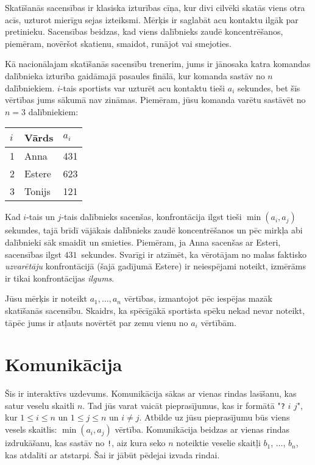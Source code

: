 

\noindent
Skatīšanās sacensības ir klasiska izturības cīņa, kur divi cilvēki skatās viens otra acīs, uzturot mierīgu sejas izteiksmi.
Mērķis ir saglabāt acu kontaktu ilgāk par pretinieku.
Sacensības beidzas, kad viens dalībnieks zaudē koncentrēšanos, piemēram, novēršot skatienu, smaidot, runājot vai smejoties.

Kā nacionālajam skatīšanās sacensību trenerim, jums ir jānosaka katra komandas dalībnieka izturība gaidāmajā pasaules finālā, kur komanda sastāv no $n$ dalībniekiem.
$i$-tais sportists var uzturēt acu kontaktu tieši $a_i$ sekundes, bet šīs vērtības jums sākumā nav zināmas.
Piemēram, jūsu komanda varētu sastāvēt no $n=3$ dalībniekiem:

\medskip
\begin{tabular}{lll}
  $i$ & Vārds & $a_i$ \\\hline
  1 & Anna &  431 \\
  2 & Estere & 623 \\
  3 & Tonijs &  121\\
\end{tabular}

\medskip
Kad $i$-tais un $j$-tais dalībnieks sacenšas, konfrontācija ilgst tieši $\min(a_i, a_j)$ sekundes, tajā brīdī vājākais dalībnieks zaudē koncentrēšanos un pēc mirkļa abi dalībnieki sāk smaidīt un smieties.
Piemēram, ja Anna sacenšas ar Esteri, sacensības ilgst $431$~sekundes.
Svarīgi ir atzīmēt, ka vērotājam no malas faktisko \emph{uzvarētāju} konfrontācijā (šajā gadījumā Estere) ir neiespējami noteikt, izmērāms ir tikai konfrontācijas \emph{ilgums}.

Jūsu mērķis ir noteikt $a_1,\ldots, a_n$ vērtības, izmantojot pēc iespējas mazāk skatīšanās sacensību.
Skaidrs, ka spēcīgākā sportista spēku nekad nevar noteikt, tāpēc jums ir atļauts novērtēt par zemu vienu no $a_i$ vērtībām.


\section*{Komunikācija}

Šis ir interaktīvs uzdevums.
Komunikācija sākas ar vienas rindas lasīšanu, kas satur veselu skaitli $n$.
Tad jūs varat vaicāt pieprasījumus, kas ir formātā "\texttt{?} $i$ $j$", kur $1\leq i\leq n$ un $1\leq j\leq n$ un $i\neq j$.
Atbilde uz jūsu pieprasījumu būs viens vesels skaitlis: $\min(a_i, a_j)$ vērtība.
Komunikācija beidzas ar vienas rindas izdrukāšanu, kas sastāv no \texttt{!}, aiz kura seko $n$ noteiktie veselie skaitļi $b_1$, $\ldots$, $b_n$, kas atdalīti ar atstarpi. Šai ir jābūt pēdejai izvada rindai.

